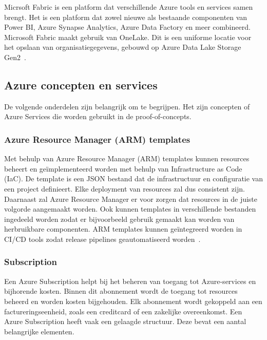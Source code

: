 Micrsoft Fabric is een platform dat verschillende Azure tools en services samen brengt. Het is een platform  dat zowel nieuwe als bestaande componenten van Power BI, Azure Synapse Analytics, Azure Data Factory en meer combineerd. Microsoft Fabric maakt gebruik van OneLake. Dit is een uniforme locatie voor het opslaan van organisatiegegevens, gebouwd op Azure Data Lake Storage Gen2~\autocite{Microsoft2024i}.

\subsection{Azure concepten en services}

De volgende onderdelen zijn belangrijk om te begrijpen. Het zijn concepten of Azure Services die worden gebruikt in de proof-of-concepts.

\subsubsection{Azure Resource Manager (ARM) templates}

Met behulp van Azure Resource Manager (ARM) templates kunnen resources beheert en geïmplementeerd worden met behulp van Infrastructure as Code (IaC). De template is een JSON bestand dat de infrastructuur en configuratie van een project definieert. Elke deployment van resources zal dus consistent zijn. Daarnaast zal Azure Resource Manager er voor zorgen dat resources in de juiste volgorde aangemaakt worden. Ook kunnen templates in verschillende bestanden ingedeeld worden zodat er bijvoorbeeld gebruik gemaakt kan worden van herbruikbare componenten. ARM templates kunnen geïntegreerd worden in CI/CD tools zodat release pipelines geautomatiseerd worden~\autocite{Azure2023}.

\subsubsection{Subscription}

Een Azure Subscription helpt bij het beheren van toegang tot Azure-services en bijhorende kosten. Binnen dit abonnement wordt de toegang tot resources beheerd en worden kosten bijgehouden. Elk abonnement wordt gekoppeld aan een factureringseenheid, zoals een creditcard of een zakelijke overeenkomst. Een Azure Subscription heeft vaak een gelaagde structuur. Deze bevat een aantal belangrijke elementen.\\


